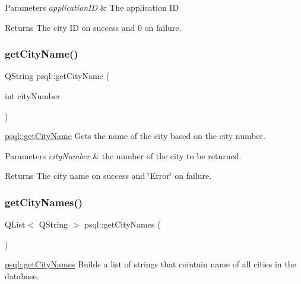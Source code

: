\begin{DoxyParams}{Parameters}
{\em application\+ID} & The application ID \\
\hline
\end{DoxyParams}
\begin{DoxyReturn}{Returns}
The city ID on success and 0 on failure. 
\end{DoxyReturn}
\mbox{\label{classpsql_a7acc18034ef60c8a1e69b0e1a15d8ab2}} 
\subsubsection{\texorpdfstring{get\+City\+Name()}{getCityName()}}
{\footnotesize\ttfamily Q\+String psql\+::get\+City\+Name (\begin{DoxyParamCaption}\item[{int}]{city\+Number }\end{DoxyParamCaption})}



\hyperlink{classpsql_a7acc18034ef60c8a1e69b0e1a15d8ab2}{psql\+::get\+City\+Name} Gets the name of the city based on the city number. 


\begin{DoxyParams}{Parameters}
{\em city\+Number} & the number of the city to be returned. \\
\hline
\end{DoxyParams}
\begin{DoxyReturn}{Returns}
The city name on success and \char`\"{}\+Error\char`\"{} on failure. 
\end{DoxyReturn}
\mbox{\label{classpsql_a42ee0cf90055ba6a7a6f564cf04d8bb8}} 
\subsubsection{\texorpdfstring{get\+City\+Names()}{getCityNames()}}
{\footnotesize\ttfamily Q\+List$<$ Q\+String $>$ psql\+::get\+City\+Names (\begin{DoxyParamCaption}{ }\end{DoxyParamCaption})}



\hyperlink{classpsql_a42ee0cf90055ba6a7a6f564cf04d8bb8}{psql\+::get\+City\+Names} Builds a list of strings that cointain name of all cities in the database. 

